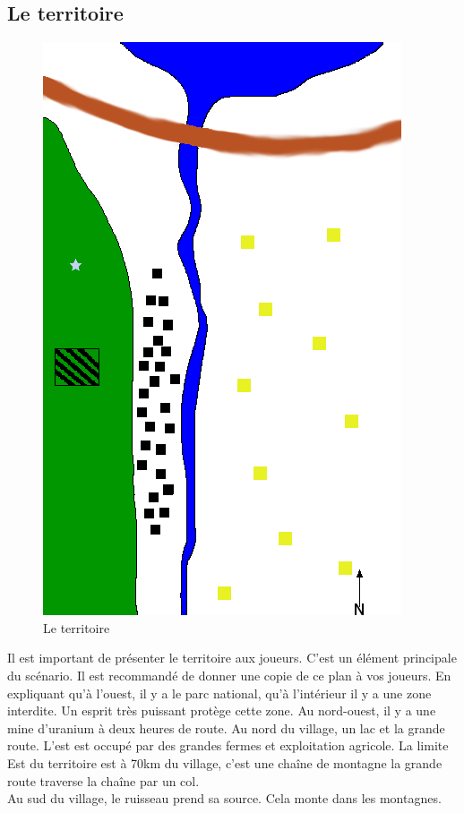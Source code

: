 \documentclass[oneside,12pt]{book}
\begin{document}
\begin{flushleft}
\subsection{Le territoire}
\begin{figure}[!ht]
\caption{\label{territoire} Le territoire}
\includegraphics[scale=0.8]{plan.png}
\end{figure}
Il est important de présenter le territoire aux joueurs.
C'est un élément principale du scénario. Il est recommandé de donner une copie de ce plan à vos joueurs. En expliquant qu'à l'ouest, il y a le parc national, qu'à l'intérieur il y a une zone interdite. Un esprit très puissant protège cette zone. Au nord-ouest, il y a une mine d'uranium à deux heures de route. Au nord du village, un lac et la grande route. L'est est occupé par des grandes fermes et exploitation agricole. La limite Est du territoire est à 70km du  village, c'est une chaîne de montagne la grande route traverse la chaîne par un col. \\
Au sud du village, le ruisseau prend sa source. Cela monte dans les montagnes. \\


\end{flushleft}
\end{document}
